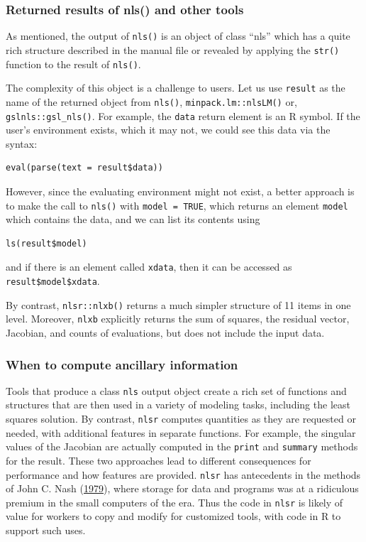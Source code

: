 \documentclass[
]{article}
\begin{document}
\hypertarget{returned-results-of-nls-and-other-tools}{%
\subsubsection{Returned results of nls() and other
tools}\label{returned-results-of-nls-and-other-tools}}

As mentioned, the output of \texttt{nls()} is an object of class ``nls''
which has a quite rich structure described in the manual file or
revealed by applying the \texttt{str()} function to the result of
\texttt{nls()}.

The complexity of this object is a challenge to users. Let us use
\texttt{result} as the name of the returned object from \texttt{nls()},
\texttt{minpack.lm::nlsLM()} or, \texttt{gslnls::gsl\_nls()}. For
example, the \texttt{data} return element is an R symbol. If the user's
environment exists, which it may not, we could see this data via the
syntax:

\begin{verbatim}
eval(parse(text = result$data))
\end{verbatim}

However, since the evaluating environment might not exist, a better
approach is to make the call to \texttt{nls()} with
\texttt{model\ =\ TRUE}, which returns an element \texttt{model} which
contains the data, and we can list its contents using

\begin{verbatim}
ls(result$model)
\end{verbatim}

and if there is an element called \texttt{xdata}, then it can be
accessed as \texttt{result\$model\$xdata}.

By contrast, \texttt{nlsr::nlxb()} returns a much simpler structure of
11 items in one level. Moreover, \texttt{nlxb} explicitly returns the
sum of squares, the residual vector, Jacobian, and counts of
evaluations, but does not include the input data.

\hypertarget{when-to-compute-ancillary-information}{%
\subsubsection{When to compute ancillary
information}\label{when-to-compute-ancillary-information}}

Tools that produce a class \texttt{nls} output object create a rich set
of functions and structures that are then used in a variety of modeling
tasks, including the least squares solution. By contrast, \texttt{nlsr}
computes quantities as they are requested or needed, with additional
features in separate functions. For example, the singular values of the
Jacobian are actually computed in the \texttt{print} and
\texttt{summary} methods for the result. These two approaches lead to
different consequences for performance and how features are provided.
\texttt{nlsr} has antecedents in the methods of John C. Nash
(\protect\hyperlink{ref-cnm79}{1979}), where storage for data and
programs was at a ridiculous premium in the small computers of the era.
Thus the code in \texttt{nlsr} is likely of value for workers to copy
and modify for customized tools, with code in R to support such uses.
\end{document}
